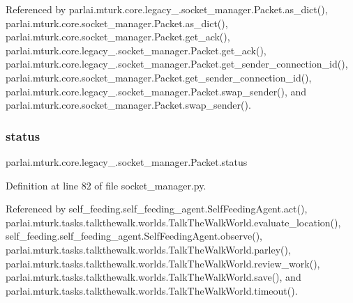 Referenced by parlai.\+mturk.\+core.\+legacy\+\_.\+socket\+\_\+manager.\+Packet.\+as\+\_\+dict(), parlai.\+mturk.\+core.\+socket\+\_\+manager.\+Packet.\+as\+\_\+dict(), parlai.\+mturk.\+core.\+socket\+\_\+manager.\+Packet.\+get\+\_\+ack(), parlai.\+mturk.\+core.\+legacy\+\_.\+socket\+\_\+manager.\+Packet.\+get\+\_\+ack(), parlai.\+mturk.\+core.\+legacy\+\_.\+socket\+\_\+manager.\+Packet.\+get\+\_\+sender\+\_\+connection\+\_\+id(), parlai.\+mturk.\+core.\+socket\+\_\+manager.\+Packet.\+get\+\_\+sender\+\_\+connection\+\_\+id(), parlai.\+mturk.\+core.\+legacy\+\_.\+socket\+\_\+manager.\+Packet.\+swap\+\_\+sender(), and parlai.\+mturk.\+core.\+socket\+\_\+manager.\+Packet.\+swap\+\_\+sender().

\mbox{\label{classparlai_1_1mturk_1_1core_1_1legacy__2018_1_1socket__manager_1_1Packet_ab0a6d9a25edeacbd5450f630d363ee35}} 
\subsubsection{\texorpdfstring{status}{status}}
{\footnotesize\ttfamily parlai.\+mturk.\+core.\+legacy\+\_.\+socket\+\_\+manager.\+Packet.\+status}



Definition at line 82 of file socket\+\_\+manager.\+py.



Referenced by self\+\_\+feeding.\+self\+\_\+feeding\+\_\+agent.\+Self\+Feeding\+Agent.\+act(), parlai.\+mturk.\+tasks.\+talkthewalk.\+worlds.\+Talk\+The\+Walk\+World.\+evaluate\+\_\+location(), self\+\_\+feeding.\+self\+\_\+feeding\+\_\+agent.\+Self\+Feeding\+Agent.\+observe(), parlai.\+mturk.\+tasks.\+talkthewalk.\+worlds.\+Talk\+The\+Walk\+World.\+parley(), parlai.\+mturk.\+tasks.\+talkthewalk.\+worlds.\+Talk\+The\+Walk\+World.\+review\+\_\+work(), parlai.\+mturk.\+tasks.\+talkthewalk.\+worlds.\+Talk\+The\+Walk\+World.\+save(), and parlai.\+mturk.\+tasks.\+talkthewalk.\+worlds.\+Talk\+The\+Walk\+World.\+timeout().

\mbox{\label{classparlai_1_1mturk_1_1core_1_1legacy__2018_1_1socket__manager_1_1Packet_a8630ab664f81e7c37fb32dbfef4f01c4}} 
